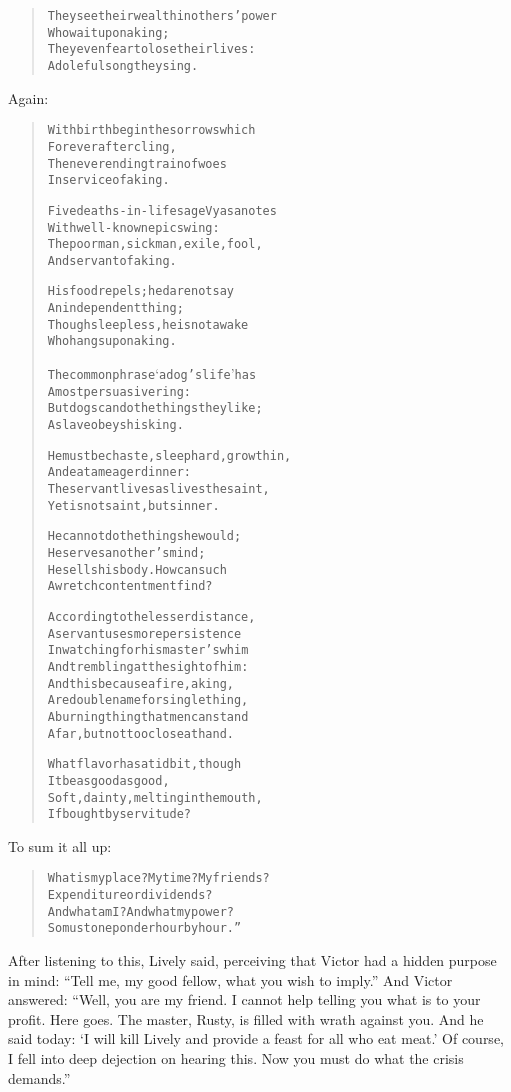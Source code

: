 \documentclass[article, twoside, 14pt]{memoir}
\renewenvironment{verbatim}{%
\begin{quote}%
\vskip -10pt%
\begin{alltt}\normalfont\large}{\end{alltt}%
\end{quote}%
\vskip -10pt
} %
\begin{document}
\begin{verbatim}
They see their wealth in others' power
    Who wait upon a king;
They even fear to lose their lives:
    A doleful song they sing.
\end{verbatim}
Again:

\begin{verbatim}
With birth begin the sorrows which
    Forever after cling,
The never ending train of woes
    In service of a king.

Five deaths-in-life sage Vyasa notes
    With well-known epic swing:
The poor man, sick man, exile, fool,
    And servant of a king.

His food repels; he dare not say
    An independent thing;
Though sleepless, he is not awake
    Who hangs upon a king.

The common phrase ‘a dog's life’ has
    A most persuasive ring:
But dogs can do the things they like;
    A slave obeys his king.

He must be chaste, sleep hard, grow thin,
    And eat a meager dinner:
The servant lives as lives the saint,
    Yet is not saint, but sinner.

He cannot do the things he would;
    He serves another's mind;
He sells his body. How can such
    A wretch contentment find?

According to the lesser distance,
A servant uses more persistence
In watching for his master's whim
And trembling at the sight of him:
And this because a fire, a king,
Are double name for single thing,
A burning thing that men can stand
Afar, but not too close at hand.

What flavor has a tidbit, though
    It be as good as good,
Soft, dainty, melting in the mouth,
    If bought by servitude?
\end{verbatim}
To sum it all up:

\begin{verbatim}
What is my place? My time? My friends?
Expenditure or dividends?
And what am I? And what my power?
So must one ponder hour by hour.”
\end{verbatim}
After listening to this, Lively said, perceiving that Victor had a
hidden purpose in mind:
``Tell me, my good fellow, what you wish to imply.'' And Victor
answered:
``Well, you are my friend. I cannot help telling you what is to your profit. Here goes. The master, Rusty, is filled with wrath against you. And he said today: `I will kill Lively and provide a feast for all who eat meat.' Of course, I fell into deep dejection on hearing this. Now you must do what the crisis demands.''
\end{document}

